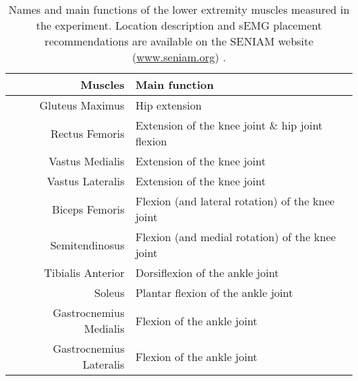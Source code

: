 \begin{table}[ht!]
    \centering
    \caption{Names and main functions of the lower extremity muscles measured in the experiment. Location description and \ac{sEMG} placement recommendations are available on the \ac{SENIAM} website (\href{www.seniam.org}{www.seniam.org}) \cite{Hermens1999}.}
    \label{tab:muscle-names}
    \small
    \begin{tabular}{r | l} %
        \textbf{Muscles}                        & \textbf{Main function} \\ \hline
        Gluteus Maximus                         & Hip extension \\
        Rectus Femoris                          & Extension of the knee joint \& hip joint flexion\\
        Vastus Medialis                         & Extension of the knee joint\\
        Vastus Lateralis                        & Extension of the knee joint\\
        Biceps Femoris                          & Flexion (and lateral rotation) of the knee joint\\
        Semitendinosus                          & Flexion (and medial rotation) of the knee joint\\
        Tibialis Anterior                       & Dorsiflexion of the ankle joint \\
        Soleus                                  & Plantar flexion of the ankle joint\\
        Gastrocnemius Medialis                  & Flexion of the ankle joint\\
        Gastrocnemius Lateralis                 & Flexion of the ankle joint\\
    \end{tabular}
\end{table}